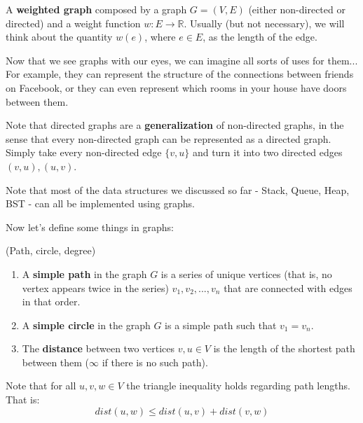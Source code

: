 \begin{definition}
  A \textbf{weighted graph} composed by a graph $G=\left( V,E \right)$ (either non-directed or directed) and a weight function $w : E \rightarrow \mathbb{R}$. Usually (but not necessary), we will think about the quantity $w(e)$, where $e \in E$, as the length of the edge.  
\end{definition}

Now that we see graphs with our eyes, we can imagine all sorts of uses for them... For example, they can represent the structure of the connections between friends on Facebook, or they can even represent which rooms in your house have doors between them.

\begin{remark}
Note that directed graphs are a \textbf{generalization} of non-directed graphs, in the sense that every non-directed graph can be represented as a directed graph. Simply take every non-directed edge $\{v,u\}$ and turn it into two directed edges $(v,u), (u,v)$. 
\end{remark}

\begin{remark}
Note that most of the data structures we discussed so far - Stack, Queue, Heap, BST - can all be implemented using graphs.
\end{remark}

Now let's define some things in graphs:

\begin{definition} (Path, circle, degree)
\begin{enumerate} 
\item A \textbf{simple path} in the graph $G$ is a series of unique vertices (that is, no vertex appears twice in the series) $v_1, v_2, ..., v_n$ that are connected with edges in that order. 
\item A \textbf{simple circle} in the graph $G$ is a simple path such that $v_1 = v_n$. 
\item The \textbf{distance} between two vertices $v,u\in V$ is the length of the shortest path between them ($\infty$ if there is no such path).
\end{enumerate}
\end{definition}

\begin{remark}
Note that for all $u,v,w\in V$ the triangle inequality holds regarding path lengths. That is:
$$dist(u,w)\leq dist(u,v) + dist(v, w)$$
\end{remark}

